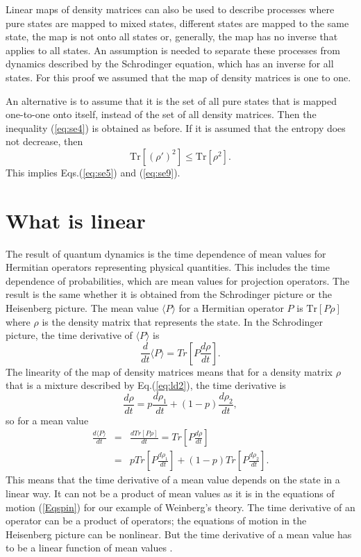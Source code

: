 \documentclass[pra, 12pt, showkeys, eqsecnum]{revtex4}
\newcommand {\Tr} {{\mbox{Tr}}}
\begin{document}
Linear maps of density matrices can also be used to describe processes where pure states are mapped to mixed states, different states are mapped to the same state, the map is not onto all states or, generally, the map has no inverse that applies to all states. An assumption is needed to separate these processes from dynamics described by the Schrodinger equation, which has an inverse for all states. For this proof we assumed that the map of density matrices is one to one.

An alternative is to assume that it is the set of all pure states that is mapped one-to-one onto itself, instead of the set of all density matrices. Then the inequality (\ref{eq:se4}) is obtained as before. If it is assumed that the entropy does not decrease\cite{PeresEntropy}, then
\begin{equation}
\label{eq:se10}
\Tr[(\rho ')^2] \leq  \Tr[\rho ^2].
\end{equation}
This implies Eqs.(\ref{eq:se5}) and (\ref{eq:se9}).

\section{What is linear}\label{six}

The result of quantum dynamics is the time dependence of mean values for Hermitian operators representing physical quantities. This includes the time dependence of probabilities, which are mean values for projection operators. The result is the same whether it is obtained from the Schrodinger picture or the Heisenberg picture. The mean value $\langle P \rangle$ for a Hermitian operator $P$ is $\Tr \left[ P \rho \right]$ where $\rho $ is the density matrix that represents the state. In the Schrodinger picture, the time derivative of $\langle P \rangle$ is
\begin{equation}
\label{eq:ld1}
\frac{d}{dt} \langle P \rangle = Tr[ P \frac{d\rho} {dt} ] .
\end{equation} The linearity of the map of density matrices means that for a density matrix $\rho $ that is a mixture described by Eq.(\ref{eq:ld2}), the time derivative is
\begin{equation}
\label{eq:ld3}
\frac{d\rho} {dt} = p\frac{d\rho_{1}} {dt} + (1-p)\frac{d\rho_{2}} {dt},
\end{equation}
so for a mean value
\begin{eqnarray}
\frac{d\langle P\rangle }{dt} & = & \frac{dTr[P\rho ]}{dt} = Tr[P\frac{d\rho }{dt}] \nonumber \\ & = & pTr[P\frac{d\rho_{1}} {dt}] + (1-p)Tr[P\frac{d\rho_{2}} {dt}].
\end{eqnarray}
This means that the time derivative of a mean value depends on the state in a linear way. It can not be a product of mean values as it is in the equations of motion (\ref{Eqspin}) for our example of Weinberg's theory. The time derivative of an operator can be a product of operators; the equations of motion in the Heisenberg picture can be nonlinear. But the time derivative of a mean value has to be a linear function of mean values \cite{me80}.
\end{document}
